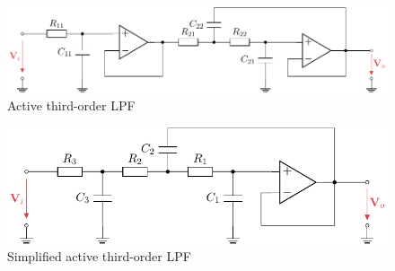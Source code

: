 \begin{figure}[!htb]
  \centering
  \includegraphics[scale=1]{figures/electronics/lowpass/lp_active_3ord_bessel/lp_active_3ord_bessel}
  \caption[Active third-order \ac{LPF}]{Active third-order \ac{LPF}%
    \label{fig:lp_active_3ord_bessel}}
\end{figure}

\begin{figure}[!htb]
  \centering
  \includegraphics[scale=1]{figures/electronics/lowpass/lp_active_3ord_bessel_simple/lp_active_3ord_bessel_simple}
  \caption[Simplified active third-order \ac{LPF}]{Simplified active third-order \ac{LPF}%
    \label{fig:lp_active_3ord_bessel_simple}}
\end{figure}

